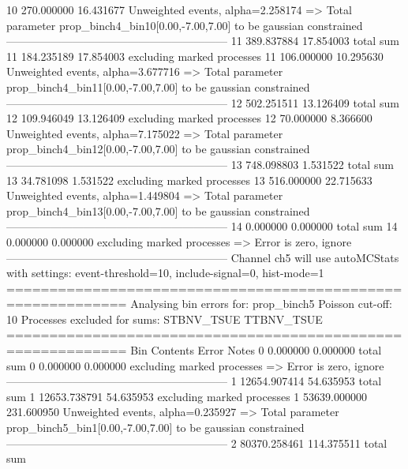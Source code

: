 10         270.000000      16.431677       Unweighted events, alpha=2.258174
  => Total parameter prop_binch4_bin10[0.00,-7.00,7.00] to be gaussian constrained
------------------------------------------------------------
11         389.837884      17.854003       total sum                     
11         184.235189      17.854003       excluding marked processes    
11         106.000000      10.295630       Unweighted events, alpha=3.677716
  => Total parameter prop_binch4_bin11[0.00,-7.00,7.00] to be gaussian constrained
------------------------------------------------------------
12         502.251511      13.126409       total sum                     
12         109.946049      13.126409       excluding marked processes    
12         70.000000       8.366600        Unweighted events, alpha=7.175022
  => Total parameter prop_binch4_bin12[0.00,-7.00,7.00] to be gaussian constrained
------------------------------------------------------------
13         748.098803      1.531522        total sum                     
13         34.781098       1.531522        excluding marked processes    
13         516.000000      22.715633       Unweighted events, alpha=1.449804
  => Total parameter prop_binch4_bin13[0.00,-7.00,7.00] to be gaussian constrained
------------------------------------------------------------
14         0.000000        0.000000        total sum                     
14         0.000000        0.000000        excluding marked processes    
  => Error is zero, ignore      
------------------------------------------------------------
Channel ch5 will use autoMCStats with settings: event-threshold=10, include-signal=0, hist-mode=1
============================================================
Analysing bin errors for: prop_binch5
Poisson cut-off: 10
Processes excluded for sums: STBNV_TSUE TTBNV_TSUE
============================================================
Bin        Contents        Error           Notes                         
0          0.000000        0.000000        total sum                     
0          0.000000        0.000000        excluding marked processes    
  => Error is zero, ignore      
------------------------------------------------------------
1          12654.907414    54.635953       total sum                     
1          12653.738791    54.635953       excluding marked processes    
1          53639.000000    231.600950      Unweighted events, alpha=0.235927
  => Total parameter prop_binch5_bin1[0.00,-7.00,7.00] to be gaussian constrained
------------------------------------------------------------
2          80370.258461    114.375511      total sum                     
